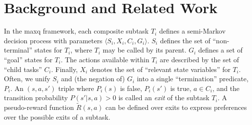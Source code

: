 \section{Background and Related Work}
\label{sec:relwork}


In the {\sc maxq} framework, each composite subtask $T_i$ defines a
semi-Markov decision process  with parameters $\langle
S_i,X_i,C_i,G_i \rangle$. $S_i$ defines the set of
``non-terminal'' states for $T_i$, where $T_i$ may be called by its
parent. $G_i$ defines a set of ``goal'' states for
$T_i$. 
The actions available
within $T_i$ are described by the set of ``child tasks'' $C_i$.
Finally, $X_i$ denotes the set of ``relevant state variables'' for
$T_i$. 
Often, we unify  $S_i$ and (the negation of) $G_i$ into a single
``termination'' predicate, $P_i$. An
$(s,a,s')$ triple where $P_i(s)$ is false, $P_i(s')$ is true, $a \in
C_i$, and the transition probability $P(s'|s,a)>0$ is called an {\em
  exit} of the subtask $T_i$. A pseudo-reward function
$\tilde{R}(s,a)$ can be defined over exits to express preferences over
the possible exits of a subtask. 


